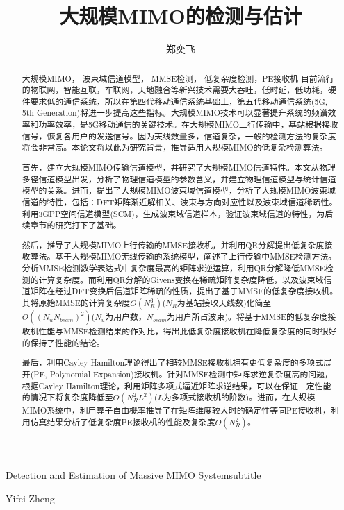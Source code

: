 \documentclass[bachelor,nocolorlinks, printoneside]{seuthesis} %
\begin{document}

\title{大规模MIMO的检测与估计}{}{Detection and Estimation of Massive MIMO System}{subtitle}
\author{郑奕飞}{Yifei Zheng}

\address{无线谷1405室}
\maketitle

\begin{abstract}{大规模MIMO， 波束域信道模型， MMSE检测， 低复杂度检测，PE接收机}
目前流行的物联网，智能互联，车联网，天地融合等新兴技术需要大吞吐，低时延，低功耗，硬件要求低的通信系统，所以在第四代移动通信系统基础上，第五代移动通信系统(5G, 5th Generation)将进一步提高这些指标。大规模MIMO技术可以显著提升系统的频谱效率和功率效率，是5G移动通信的关键技术。在大规模MIMO上行传输中，基站根据接收信号，恢复各用户的发送信号。因为天线数量多，信道复杂，一般的检测方法的复杂度将会非常高。本论文将以此为研究背景，推导适用大规模MIMO的低复杂检测算法。

首先，建立大规模MIMO传输信道模型，并研究了大规模MIMO信道特性。本文从物理多径信道模型出发，分析了物理信道模型的参数含义，并建立物理信道模型与统计信道模型的关系。进而，提出了大规模MIMO波束域信道模型，分析了大规模MIMO波束域信道的特性，包括：DFT矩阵渐近解相关、波束与方向对应性以及波束域信道稀疏性。利用3GPP空间信道模型(SCM)，生成波束域信道样本，验证波束域信道的特性，为后续章节的研究打下了基础。

然后，推导了大规模MIMO上行传输的MMSE接收机，并利用QR分解提出低复杂度接收算法。基于大规模MIMO无线传输的系统模型，阐述了上行传输中MMSE检测方法。分析MMSE检测数学表达式中复杂度最高的矩阵求逆运算，利用QR分解降低MMSE检测的计算复杂度。而利用QR分解的Givens变换在稀疏矩阵复杂度降低，以及波束域信道矩阵在经过DFT变换后信道矩阵稀疏的性质，提出了基于MMSE的低复杂度接收机。其将原始MMSE的计算复杂度$O(N_R^3)$($N_R$为基站接收天线数)化简至$O((N_uN_{beam})^2)$($N_u$为用户数，$N_{beam}$为用户所占波束)。将基于MMSE的低复杂度接收机性能与MMSE检测结果的作对比，得出此低复杂度接收机在降低复杂度的同时很好的保持了性能的结论。

最后，利用Cayley Hamilton理论得出了相较MMSE接收机拥有更低复杂度的多项式展开(PE, Polynomial Expansion)接收机。针对MMSE检测中矩阵求逆复杂度高的问题，根据Cayley Hamilton理论，利用矩阵多项式逼近矩阵求逆结果，可以在保证一定性能的情况下将复杂度降低至$O(N_R^2L^2)$($L$为多项式接收机的阶数)。进而，在大规模MIMO系统中，利用算子自由概率推导了在矩阵维度较大时的确定性等同PE接收机，利用仿真结果分析了低复杂度PE接收机的性能及复杂度$O(N_R^2)$。
\end{abstract}
\end{document}
